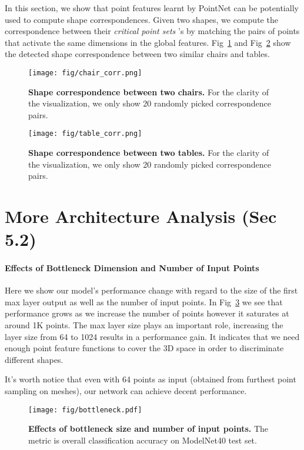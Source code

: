 \documentclass[10pt,twocolumn,letterpaper]{article}
\begin{document}
In this section, we show that point features learnt by PointNet can be potentially used to compute shape correspondences. Given two shapes, we compute the correspondence between their \textit{critical point sets} 's by matching the pairs of points that activate the same dimensions in the global features. Fig~\ref{fig:chair_corr} and Fig~\ref{fig:table_corr} show the detected shape correspondence between two similar chairs and tables.

\begin{figure}[h]
    \centering
    \texttt{[image: fig/chair\_corr.png]}
    \caption{\textbf{Shape correspondence between two chairs.} For the clarity of the visualization, we only show 20 randomly picked correspondence pairs.}
    \label{fig:chair_corr}
\end{figure}

\begin{figure}[h]
    \centering
    \texttt{[image: fig/table\_corr.png]}
    \caption{\textbf{Shape correspondence between two tables.} For the clarity of the visualization, we only show 20 randomly picked correspondence pairs.}
    \label{fig:table_corr}
\end{figure}


\section{More Architecture Analysis (Sec 5.2)}
\label{sec:architecture}


\paragraph{Effects of Bottleneck Dimension and Number of Input Points}
Here we show our model's performance change with regard to the size of the first max layer output as well as the number of input points. In Fig~\ref{fig:net_param} we see that performance grows as we increase the number of points however it saturates at around 1K points. The max layer size plays an important role, increasing the layer size from 64 to 1024 results in a  performance gain. It indicates that we need enough point feature functions to cover the 3D space in order to discriminate different shapes.

It's worth notice that even with 64 points as input (obtained from furthest point sampling on meshes), our network can achieve decent performance.

\begin{figure}[h]
    \centering
    \texttt{[image: fig/bottleneck.pdf]}
    \caption{\textbf{Effects of bottleneck size and number of input points.} The metric is overall classification accuracy on ModelNet40 test set.}
    \label{fig:net_param}
\end{figure}
\end{document}
